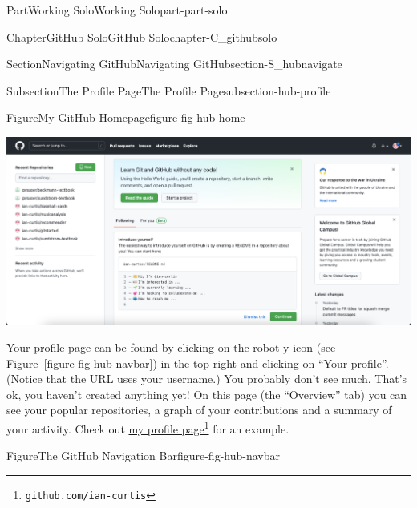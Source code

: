 \documentclass[oneside,10pt,]{book}
\newcommand{\xreffont}{\relax}
\begin{document}
\begin{partptx}{Part}{Working Solo}{}{Working Solo}{}{}{part-part-solo}
\begin{chapterptx}{Chapter}{GitHub Solo}{}{GitHub Solo}{}{}{chapter-C_githubsolo}
\begin{sectionptx}{Section}{Navigating GitHub}{}{Navigating GitHub}{}{}{section-S_hubnavigate}
\begin{subsectionptx}{Subsection}{The Profile Page}{}{The Profile Page}{}{}{subsection-hub-profile}
\begin{figureptx}{Figure}{My GitHub Homepage}{figure-fig-hub-home}{}
\begin{image}{0.05}{0.9}{0.05}{}%
\includegraphics[width=\linewidth]{external/hub_home.pdf}
\end{image}%
\tcblower
\end{figureptx}%
Your profile page can be found by clicking on the robot-y icon (see \hyperref[figure-fig-hub-navbar]{Figure~{\xreffont\ref{figure-fig-hub-navbar}}}) in the top right and clicking on ``Your profile''. (Notice that the URL uses your username.) You probably don't see much. That's ok, you haven't created anything yet! On this page (the ``Overview'' tab) you can see your popular repositories, a graph of your contributions and a summary of your activity. Check out \href{https://github.com/ian-curtis}{my profile page}\footnote{\nolinkurl{github.com/ian-curtis}\label{fn-hub-profile-i-e}} for an example.%
\begin{figureptx}{Figure}{The GitHub Navigation Bar}{figure-fig-hub-navbar}{}%
\begin{image}{0.35}{0.3}{0.35}{}%

\end{image}
\end{figureptx}
\end{subsectionptx}
\end{sectionptx}
\end{chapterptx}
\end{partptx}
\end{document}
